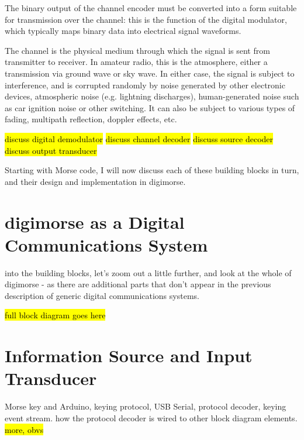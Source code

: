 \documentclass[a4paper]{tufte-handout}
\begin{document}
    The binary output of the channel encoder must be converted into a form suitable for transmission over the
    channel: this is the function of the digital modulator, which typically maps binary data into electrical signal
    waveforms.

    The channel is the physical medium through which the signal is sent from transmitter to receiver. In amateur
    radio, this is the atmosphere, either a transmission via ground wave or sky wave. In either case, the signal is
    subject to interference, and is corrupted randomly by noise generated by other electronic devices, atmospheric
    noise (e.g. lightning discharges), human-generated noise such as car ignition noise or other switching. It can
    also be subject to various types of fading, multipath reflection, doppler effects, etc.


	\hl{discuss digital demodulator}
	\hl{discuss channel decoder}
	\hl{discuss source decoder}
	\hl{discuss output transducer}
	

    Starting with Morse code, I will now discuss each of these building blocks in turn, and their design and implementation in digimorse.


\section{digimorse as a Digital Communications System}
     into the building blocks, let's zoom out a little further, and look at the whole of digimorse - as there are additional parts that don't appear in the previous description of generic digital communications systems. 


	\hl{full block diagram goes here}
	    

\section{Information Source and Input Transducer}

Morse key and Arduino, keying protocol, USB Serial, protocol decoder, keying event stream.
how the protocol decoder is wired to other block diagram elements.
\hl{more, obvs}
\end{document}
